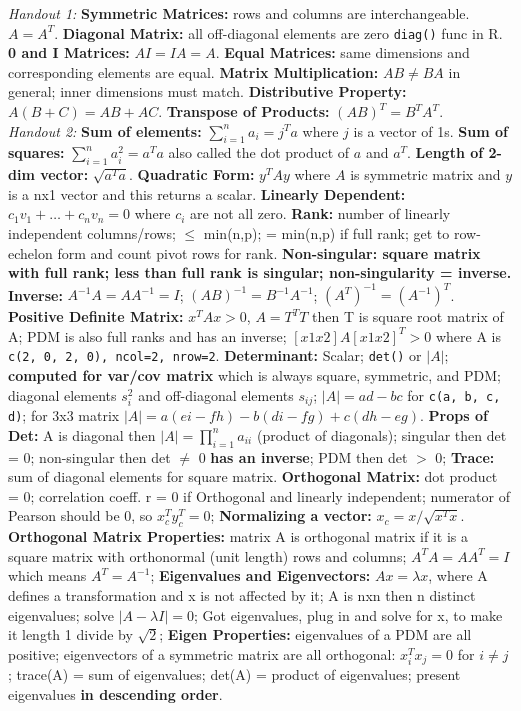 \documentclass[9pt]{extarticle}
\begin{document}
 
\textit{Handout 1:} \textbf{Symmetric Matrices:} rows and columns are 
interchangeable. $A = A^T$. 
\textbf{Diagonal Matrix:} all off-diagonal elements are zero \texttt{diag()} 
func in R. 
\textbf{0 and I Matrices:} $AI = IA = A$.
\textbf{Equal Matrices:} same dimensions and corresponding elements are equal.
\textbf{Matrix Multiplication:} $AB \neq BA$ in general; inner dimensions must
match.
\textbf{Distributive Property:} $A(B + C) = AB + AC$.
\textbf{Transpose of Products:} $(AB)^T = B^TA^T$.\\

\textit{Handout 2:}
\textbf{Sum of elements:} $\sum_{i=1}^n a_i = j^Ta$ where $j$ is a vector of 1s.
\textbf{Sum of squares:} $\sum_{i=1}^n a_i^2 = a^Ta$ also called the dot
product of $a$ and $a^T$.
\textbf{Length of 2-dim vector:} $\sqrt{a^Ta}$.
\textbf{Quadratic Form:} $y^TAy$ where $A$ is symmetric matrix and $y$ is a nx1
vector and this returns a scalar.
\textbf{Linearly Dependent:} $c_1v_1 + \ldots + c_nv_n = 0$ where $c_i$ 
are not all zero.
\textbf{Rank:} number of linearly independent columns/rows; $\leq$ min(n,p);
= min(n,p) if full rank; get to row-echelon form and count pivot rows for rank.
\textbf{Non-singular: square matrix with full rank; less than full rank is
singular; non-singularity = inverse.}
\textbf{Inverse:} $A^{-1}A = AA^{-1}= I$; $(AB)^{-1} = B^{-1}A^{-1}$; $(A^T)^
{-1} = (A^{-1})^T$.
\textbf{Positive Definite Matrix:} $x^TAx > 0$, $A = T^TT$ then T is square root
matrix of A; PDM is also full ranks and has an inverse; $[x1 x2]A[x1 x2]^T > 0$ 
where A is \texttt{c(2, 0, 2, 0), ncol=2, nrow=2}.
\textbf{Determinant:} Scalar; \texttt{det()} or $|A|$; \textbf{computed for 
var/cov  matrix} which is always square, symmetric, and PDM; diagonal 
elements $s_i^2$ and off-diagonal elements $s_{ij}$; $|A| = ad - bc$ for
\texttt{c(a, b, c, d)}; for 3x3 matrix $|A| = a(ei - fh) - b(di - fg) + 
c(dh - eg)$.
\textbf{Props of Det:} A is diagonal then $|A| = \prod_{i=1}^n a_{ii}$ (product
of diagonals); singular then det = 0; non-singular then det $\neq$ 0 \textbf{has
an inverse}; PDM then
det $>$ 0;
\textbf{Trace:} sum of diagonal elements for square matrix.
\textbf{Orthogonal Matrix:} dot product = 0; correlation coeff. r = 0 if 
Orthogonal and linearly independent; numerator of Pearson should be 0, so 
$x_c^Ty_c^T = 0$;
\textbf{Normalizing a vector:} $x_c = x/\sqrt{x^Tx}$.
\textbf{Orthogonal Matrix Properties:} matrix A is orthogonal matrix if it is 
a square matrix with orthonormal (unit length) rows and columns; $A^TA = AA^T 
= I$ which means $A^T = A^{-1}$;
\textbf{Eigenvalues and Eigenvectors:} $Ax = \lambda x$, where A defines a 
transformation and x is not affected by it; A is nxn then n distinct 
eigenvalues; solve $|A - \lambda I| = 0$; Got eigenvalues, plug in and solve 
for x, to make it length 1 divide by $\sqrt{2}$;
\textbf{Eigen Properties:} eigenvalues of a PDM are all positive; eigenvectors 
of a symmetric matrix are all orthogonal: $x_i^Tx_j = 0$ for $i \neq j$; 
trace(A) = sum of eigenvalues; det(A) = product of eigenvalues; present 
eigenvalues \textbf{in descending order}.\\
\end{document}

